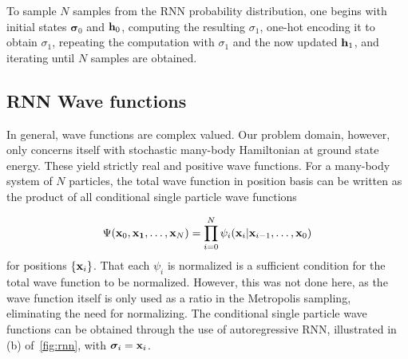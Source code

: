 To sample \(N\) samples from the RNN probability distribution, one begins with
initial states \(\bm{\sigma}_{0}\) and \(\vb{h}_{0}\), computing the resulting
\(\sigma_{1}\), one-hot encoding it to obtain \(\sigma_{1}\), repeating the
computation with \(\sigma_{1}\) and the now updated \(\vb{h}_{1}\), and
iterating until \(N\) samples are obtained.

\subsection{RNN Wave functions}

In general, wave functions are complex valued. Our problem domain, however,
only concerns itself with stochastic many-body Hamiltonian at ground state
energy. These yield strictly real and positive wave
functions\cite{Sharir_2020}. For a many-body system of \(N\) particles, the
total wave function in position basis can be written as the product of all conditional single particle wave
functions

\begin{equation*}
  \Psi(\vb{x}_{0}, \vb{x_{1}}, \ldots, \vb{x}_{N}) = \prod_{i=0}^{N}\psi_{i}(\vb{x}_{i}|\vb{x}_{i-1}, \ldots, \vb{x}_{0})
\end{equation*}
for positions \(\left\{  \vb{x}_{i}\right\}\). That each \(\psi_{i}\) is normalized is a
sufficient condition for the total wave function to be
normalized\cite{Sharir_2020}. However, this was not done here, as the wave
function itself is only used as a ratio in the Metropolis sampling, eliminating 
the need for normalizing. The conditional single particle wave functions can
be obtained through the use of autoregressive RNN, illustrated in (b)
of~\cref{fig:rnn}, with \(\bm{\sigma}_{i} = \vb{x}_{i}\).

